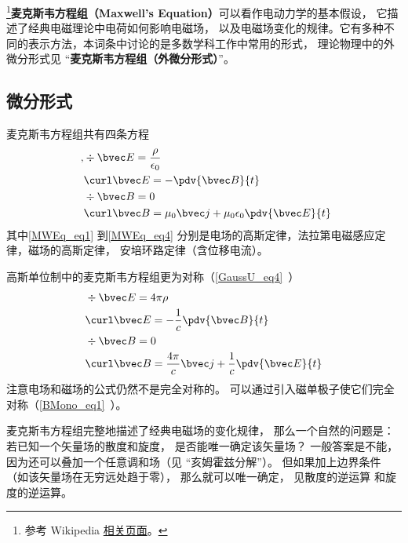 
\begin{issues}
\end{issues}


\footnote{参考 Wikipedia \href{https://en.wikipedia.org/wiki/Maxwell's_equations}{相关页面}。}\textbf{麦克斯韦方程组（Maxwell's Equation）}可以看作电动力学的基本假设， 它描述了经典电磁理论中电荷如何影响电磁场， 以及电磁场变化的规律。它有多种不同的表示方法，本词条中讨论的是多数学科工作中常用的形式， 理论物理中的外微分形式见 “\textbf{麦克斯韦方程组（外微分形式）}”。

\subsection{微分形式}
麦克斯韦方程组共有四条方程
\begin{align}\label{MWEq_eq1}~,
&\div \bvec E = \frac{\rho}{\epsilon_0}\\
\label{MWEq_eq2}
&\curl \bvec E = -\pdv{\bvec B}{t}\\
\label{MWEq_eq3}
&\div \bvec B = 0\\
\label{MWEq_eq4}
&\curl \bvec B = \mu_0 \bvec j + \mu_0\epsilon_0 \pdv{\bvec E}{t}
\end{align}
其中\autoref{MWEq_eq1} 到\autoref{MWEq_eq4} 分别是电场的高斯定律，法拉第电磁感应定律，磁场的高斯定律， 安培环路定律（含位移电流）。

高斯单位制中的麦克斯韦方程组更为对称（\autoref{GaussU_eq4}~）
\begin{equation}
\begin{aligned}
&\div \bvec E = 4\pi\rho\\
&\curl \bvec E = -\frac{1}{c}\pdv{\bvec B}{t}\\
&\div \bvec B = 0 \\
&\curl \bvec B = \frac{4\pi}{c} \bvec j + \frac{1}{c}\pdv{\bvec E}{t}
\end{aligned}
\end{equation}
注意电场和磁场的公式仍然不是完全对称的。 可以通过引入磁单极子使它们完全对称（\autoref{BMono_eq1}~）。

麦克斯韦方程组完整地描述了经典电磁场的变化规律， 那么一个自然的问题是： 若已知一个矢量场的散度和旋度， 是否能唯一确定该矢量场？ 一般答案是不能， 因为还可以叠加一个任意调和场（见 “亥姆霍兹分解”）。 但如果加上边界条件（如该矢量场在无穷远处趋于零）， 那么就可以唯一确定， 见散度的逆运算 和旋度的逆运算。

